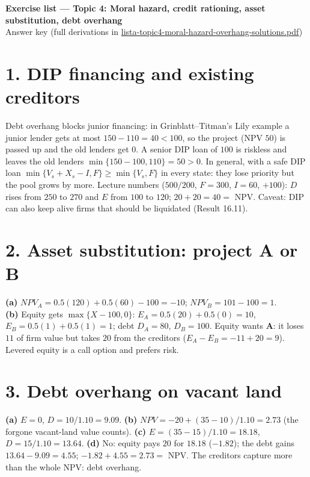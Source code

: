 \documentclass[11pt,a4paper]{article}
\begin{document}
\begin{center}{\Large\bfseries Exercise list --- Topic 4: Moral hazard, credit rationing, asset substitution, debt overhang}\\[4pt]{\large Answer key (full derivations in \url{lista-topic4-moral-hazard-overhang-solutions.pdf})}\end{center}


\section*{1. DIP financing and existing creditors}
Debt overhang blocks junior financing: in Grinblatt--Titman's Lily example a junior lender gets at
most $150-110=40<100$, so the project (NPV $50$) is passed up and the old lenders get $0$. A senior
DIP loan of $100$ is riskless and leaves the old lenders $\min\{150-100,110\}=50>0$. In general,
with a safe DIP loan $\min\{V_s+X_s-I,F\}\ge\min\{V_s,F\}$ in every state: they lose priority but
the pool grows by more. Lecture numbers ($500/200$, $F=300$, $I=60$, $+100$): $D$ rises from
$250$ to $270$ and $E$ from $100$ to $120$; $20+20=40=$ NPV. Caveat: DIP can also keep alive firms
that should be liquidated (Result 16.11).

\section*{2. Asset substitution: project A or B}
\textbf{(a)} $\mathit{NPV}_A=0.5(120)+0.5(60)-100=-10$; $\mathit{NPV}_B=101-100=1$.\\
\textbf{(b)} Equity gets $\max\{X-100,0\}$: $E_A=0.5(20)+0.5(0)=10$, $E_B=0.5(1)+0.5(1)=1$; debt
$D_A=80$, $D_B=100$. Equity wants \textbf{A}: it loses $11$ of firm value but takes $20$ from the
creditors ($E_A-E_B=-11+20=9$). Levered equity is a call option and prefers risk.

\section*{3. Debt overhang on vacant land}
\textbf{(a)} $E=0$, $D=10/1.10=9.09$.
\textbf{(b)} $\mathit{NPV}=-20+(35-10)/1.10=2.73$ (the forgone vacant-land value counts).
\textbf{(c)} $E=(35-15)/1.10=18.18$, $D=15/1.10=13.64$.
\textbf{(d)} No: equity pays $20$ for $18.18$ ($-1.82$); the debt gains $13.64-9.09=4.55$;
$-1.82+4.55=2.73=$ NPV. The creditors capture more than the whole NPV: debt overhang.
\end{document}
